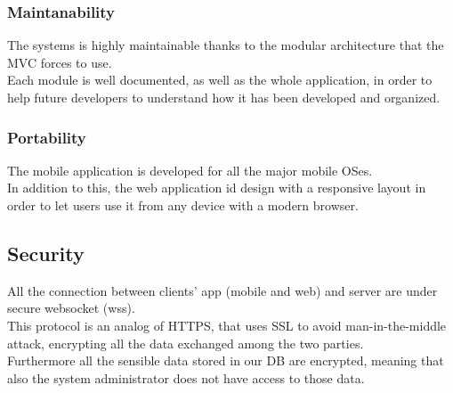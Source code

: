 \subsubsection{Maintanability}
The systems is highly maintainable thanks to the modular architecture that the MVC forces to use.\\
Each module is well documented, as well as the whole application, in order to help future developers to understand how it has been developed and organized.

\subsubsection{Portability}
The mobile application is developed for all the major mobile OSes.\\
In addition to this, the web application id design with a responsive layout in order to let users use it from any device with a modern browser.

\subsection{Security}
All the connection between clients’ app (mobile and web) and server are under secure websocket (wss).\\
This protocol is an analog of HTTPS, that uses SSL to avoid man-in-the-middle attack, encrypting all the data exchanged among the two parties.\\
Furthermore all the sensible data stored in our DB are encrypted, meaning that also the system administrator does not have access to those data.
